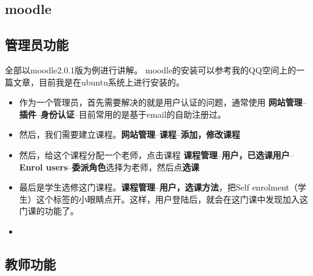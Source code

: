 \documentclass[a4paper,12pt,twoside]{book}
\begin{document}
\begin{CJK*}{UTF8}{song}
\section{moodle}
\subsection{管理员功能}
全部以moodle2.0.1版为例进行讲解。
moodle的安装可以参考我的QQ空间上的一篇文章，目前我是在ubuntu系统上进行安装的。
\begin{itemize}
\item 作为一个管理员，首先需要解决的就是用户认证的问题，通常使用 \textbf{网站管理}--\textbf{插件}--\textbf{身份认证}--目前常用的是基于email的自助注册过。
\item 然后，我们需要建立课程。\textbf{网站管理}--\textbf{课程}--\textbf{添加，修改课程}
\item 然后，给这个课程分配一个老师，点击课程 \textbf{课程管理}--\textbf{用户，已选课用户}--\textbf{Enrol users}--\textbf{委派角色}选择为老师，然后点\textbf{选课}
\item 最后是学生选修这门课程。\textbf{课程管理}--\textbf{用户，选课方法}，把Self enrolment（学生）这个标签的小眼睛点开。这样，用户登陆后，就会在这门课中发现加入这门课的功能了。
\item 
\end{itemize}
\subsection{教师功能}



\end{CJK*}
\end{document}
